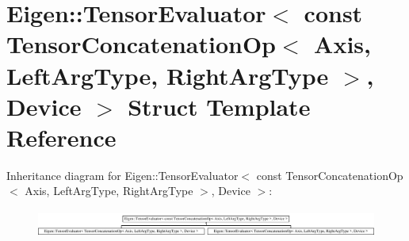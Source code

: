\hypertarget{struct_eigen_1_1_tensor_evaluator_3_01const_01_tensor_concatenation_op_3_01_axis_00_01_left_arg_e37e1b61d31098a96aab7c22793b325c}{}\section{Eigen\+:\+:Tensor\+Evaluator$<$ const Tensor\+Concatenation\+Op$<$ Axis, Left\+Arg\+Type, Right\+Arg\+Type $>$, Device $>$ Struct Template Reference}
\label{struct_eigen_1_1_tensor_evaluator_3_01const_01_tensor_concatenation_op_3_01_axis_00_01_left_arg_e37e1b61d31098a96aab7c22793b325c}
Inheritance diagram for Eigen\+:\+:Tensor\+Evaluator$<$ const Tensor\+Concatenation\+Op$<$ Axis, Left\+Arg\+Type, Right\+Arg\+Type $>$, Device $>$\+:\begin{figure}[H]
\begin{center}
\leavevmode
\includegraphics[height=0.919540cm]{struct_eigen_1_1_tensor_evaluator_3_01const_01_tensor_concatenation_op_3_01_axis_00_01_left_arg_e37e1b61d31098a96aab7c22793b325c}
\end{center}
\end{figure}
